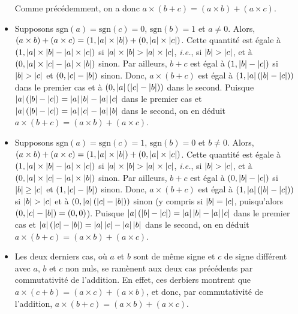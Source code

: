 \begin{itemize}[nosep]
        Comme précédemment, on a donc $a \times (b + c) = (a \times b) + (a \times c)$.
    \item Supposons $\mathrm{sgn}(a) = \mathrm{sgn}(c) = 0$, $\mathrm{sgn}(b) = 1$ et $a \neq 0$. 
        Alors, $(a \times b) + (a \times c) = (1, \abs{a} \times \abs{b}) + (0, \abs{a} \times \abs{c})$. 
        Cette quantité est égale à $(1, \abs{a} \times \abs{b} - \abs{a} \times \abs{c})$ si $\abs{a} \times \abs{b} > \abs{a} \times \abs{c}$, \textit{i.e.}, si $\abs{b} > \abs{c}$, et à $(0, \abs{a} \times \abs{c} - \abs{a} \times \abs{b})$ sinon.
        Par ailleurs, $b + c$ est égal à $(1, \abs{b} - \abs{c})$ si $\abs{b} > \abs{c}$ et $(0, \abs{c} - \abs{b})$ sinon.
        Donc, $a \times (b + c)$ est égal à $(1, \abs{a} (\abs{b} - \abs{c}))$ dans le premier cas et à $(0, \abs{a} (\abs{c} - \abs{b}))$ dans le second.
        Puisque $\abs{a} (\abs{b} - \abs{c}) = \abs{a} \abs{b} - \abs{a} \abs{c}$ dans le premier cas et $\abs{a} (\abs{b} - \abs{c}) = \abs{a} \abs{c} - \abs{a} \abs{b}$ dans le second, on en déduit $a \times (b + c) = (a \times b) + (a \times c)$.
    \item Supposons $\mathrm{sgn}(a) = \mathrm{sgn}(c) = 1$, $\mathrm{sgn}(b) = 0$ et $b \neq 0$. 
        Alors, $(a \times b) + (a \times c) = (1, \abs{a} \times \abs{b}) + (0, \abs{a} \times \abs{c})$. 
        Cette quantité est égale à $(1, \abs{a} \times \abs{b} - \abs{a} \times \abs{c})$ si $\abs{a} \times \abs{b} > \abs{a} \times \abs{c}$, \textit{i.e.}, si $\abs{b} > \abs{c}$, et à $(0, \abs{a} \times \abs{c} - \abs{a} \times \abs{b})$ sinon.
        Par ailleurs, $b + c$ est égal à $(0, \abs{b} - \abs{c})$ si $\abs{b} \geq \abs{c}$ et $(1, \abs{c} - \abs{b})$ sinon.
        Donc, $a \times (b + c)$ est égal à $(1, \abs{a} (\abs{b} - \abs{c}))$ si $\abs{b} > \abs{c}$ et à $(0, \abs{a} (\abs{c} - \abs{b}))$ sinon (y compris si $\abs{b} = \abs{c}$, puisqu'alors $(0, \abs{c} - \abs{b}) = (0,0)$).
        Puisque $\abs{a} (\abs{b} - \abs{c}) = \abs{a} \abs{b} - \abs{a} \abs{c}$ dans le premier cas et $\abs{a} (\abs{c} - \abs{b}) = \abs{a} \abs{c} - \abs{a} \abs{b}$ dans le second, on en déduit $a \times (b + c) = (a \times b) + (a \times c)$.
    \item Les deux derniers cas, où $a$ et $b$ sont de même signe et $c$ de signe différent avec $a$, $b$ et $c$ non nuls, se ramènent aux deux cas précédents par commutativité de l'addition.
        En effet, ces derbiers montrent que $a \times (c + b) = (a \times c) + (a \times b)$, et donc, par commutativité de l'addition, $a \times (b + c) = (a \times b) + (a \times c)$.
\end{itemize}

